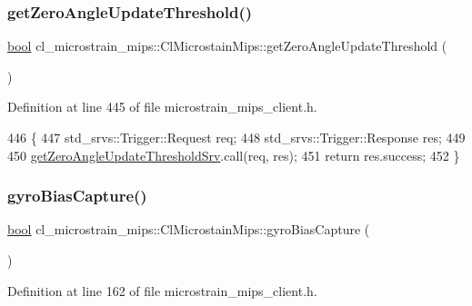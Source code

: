 \subsubsection{\texorpdfstring{get\+Zero\+Angle\+Update\+Threshold()}{getZeroAngleUpdateThreshold()}}
{\footnotesize\ttfamily \hyperlink{classbool}{bool} cl\+\_\+microstrain\+\_\+mips\+::\+Cl\+Microstain\+Mips\+::get\+Zero\+Angle\+Update\+Threshold (\begin{DoxyParamCaption}{ }\end{DoxyParamCaption})\hspace{0.3cm}{\ttfamily [inline]}}



Definition at line 445 of file microstrain\+\_\+mips\+\_\+client.\+h.


\begin{DoxyCode}
446     \{
447         std\_srvs::Trigger::Request req;
448         std\_srvs::Trigger::Response res;
449 
450         \hyperlink{classcl__microstrain__mips_1_1ClMicrostainMips_ae720970f4114e7b6524b59df405ede83}{getZeroAngleUpdateThresholdSrv}.call(req, res);
451         \textcolor{keywordflow}{return} res.success;
452     \}
\end{DoxyCode}
\mbox{\label{classcl__microstrain__mips_1_1ClMicrostainMips_ada40a42a0d479c9651bc4a735a76ce39}} 
\subsubsection{\texorpdfstring{gyro\+Bias\+Capture()}{gyroBiasCapture()}}
{\footnotesize\ttfamily \hyperlink{classbool}{bool} cl\+\_\+microstrain\+\_\+mips\+::\+Cl\+Microstain\+Mips\+::gyro\+Bias\+Capture (\begin{DoxyParamCaption}{ }\end{DoxyParamCaption})\hspace{0.3cm}{\ttfamily [inline]}}



Definition at line 162 of file microstrain\+\_\+mips\+\_\+client.\+h.


